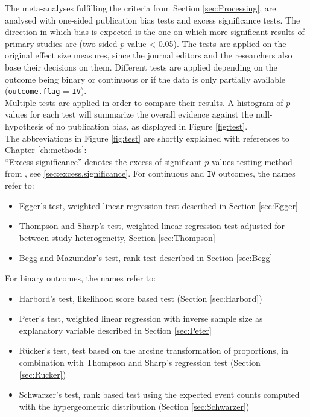 \documentclass[11pt,a4paper,twoside]{book}\usepackage[]{graphicx}\usepackage[]{color}
\begin{document}
The meta-analyses fulfilling the criteria from Section \ref{sec:Processing}, are analysed with one-sided publication bias tests and excess significance tests. The direction in which bias is expected is the one on which more significant results of primary studies are (two-sided $p$-value < 0.05). The tests are applied on the original effect size measures, since the journal editors and the researchers also base their decisions on them. Different tests are applied depending on the outcome being binary or continuous or if the data is only partially available (\texttt{outcome.flag} = \texttt{IV}).\\
Multiple tests are applied in order to compare their results. A histogram of $p$-values for each test will summarize the overall evidence against the null-hypothesis of no publication bias, as displayed in Figure \ref{fig:test}.\\
The abbreviations in Figure \ref{fig:test}  are shortly explained with references to Chapter \ref{ch:methods}: \\
``Excess significance'' denotes the excess of significant $p$-values testing method from \citet{excess.significance}, see \ref{sec:excess.significance}. For continuous and \texttt{IV} outcomes, the names refer to: 

\begin{itemize}
\item Egger's test, weighted linear regression test described in Section \ref{sec:Egger}
\item Thompson and Sharp's test, weighted linear regression test adjusted for between-study heterogeneity, Section \ref{sec:Thompson}
\item Begg and Mazumdar's test, rank test described in Section \ref{sec:Begg}
\end{itemize}

For binary outcomes, the names refer to:
\begin{itemize}
\item Harbord's test, likelihood score based test (Section \ref{sec:Harbord})
\item Peter's test, weighted linear regression with inverse sample size as explanatory variable described in Section \ref{sec:Peter}
\item R\"ucker's test, test based on the arcsine transformation of proportions, in combination with Thompson and Sharp's regression test (Section \ref{sec:Rucker})
\item Schwarzer's test, rank based test using the expected event counts computed with the hypergeometric distribution (Section \ref{sec:Schwarzer})
\end{itemize}
\end{document}
